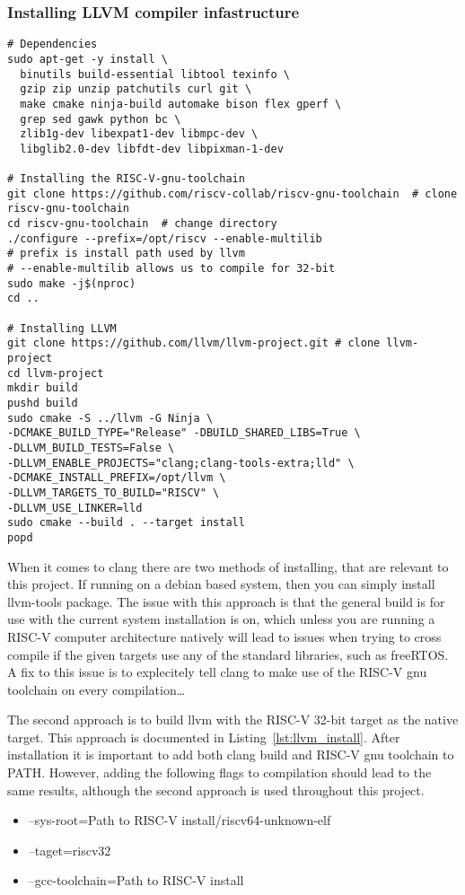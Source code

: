 \subsubsection{Installing LLVM compiler infastructure}
\begin{lstlisting}[caption=Installing LLVM compiler infastructure with RISC-V
32-bit as native target., float=*, label=lst:llvm_install]
# Dependencies
sudo apt-get -y install \
  binutils build-essential libtool texinfo \
  gzip zip unzip patchutils curl git \
  make cmake ninja-build automake bison flex gperf \
  grep sed gawk python bc \
  zlib1g-dev libexpat1-dev libmpc-dev \
  libglib2.0-dev libfdt-dev libpixman-1-dev

# Installing the RISC-V-gnu-toolchain
git clone https://github.com/riscv-collab/riscv-gnu-toolchain  # clone
riscv-gnu-toolchain
cd riscv-gnu-toolchain  # change directory
./configure --prefix=/opt/riscv --enable-multilib
# prefix is install path used by llvm
# --enable-multilib allows us to compile for 32-bit
sudo make -j$(nproc)
cd ..

# Installing LLVM
git clone https://github.com/llvm/llvm-project.git # clone llvm-project
cd llvm-project
mkdir build
pushd build
sudo cmake -S ../llvm -G Ninja \
-DCMAKE_BUILD_TYPE="Release" -DBUILD_SHARED_LIBS=True \
-DLLVM_BUILD_TESTS=False \
-DLLVM_ENABLE_PROJECTS="clang;clang-tools-extra;lld" \
-DCMAKE_INSTALL_PREFIX=/opt/llvm \
-DLLVM_TARGETS_TO_BUILD="RISCV" \
-DLLVM_USE_LINKER=lld
sudo cmake --build . --target install
popd
\end{lstlisting}
When it comes to clang there are two methods of installing, that are relevant to
this project. If running on a debian based system, then you can simply install
llvm-tools package. The issue with this approach is that the general build is
for use with the current system installation is on, which unless you are running
a RISC-V computer architecture natively will lead to issues when trying to cross
compile if the given targets use any of the standard libraries, such as
freeRTOS. A fix to this issue is to explecitely tell clang to make use of the
RISC-V gnu toolchain on every compilation\dots

The second approach is to build llvm with the RISC-V 32-bit target as the native
target. This approach is documented in Listing~\ref{lst:llvm_install}. After
installation it is important to add both clang build and RISC-V gnu toolchain to
PATH. However, adding the following flags to compilation
should lead to the same results, although the second approach is used throughout
this project.
\begin{itemize}
  \item --sys-root={Path to RISC-V install}/riscv64-unknown-elf
  \item --taget=riscv32
  \item --gcc-toolchain={Path to RISC-V install}
\end{itemize}


